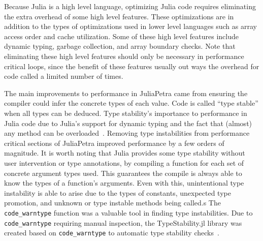 \documentclass[acmsmall]{acmart}
\newcommand{\snippet}[1]{\lstinline{#1}}
\begin{document}
	Because Julia is a high level language, optimizing Julia code requires eliminating the extra overhead of some high level features.
	These optimizations are in addition to the types of optimizations used in lower level languages such as array access order and cache utilization.
	Some of these high level features include dynamic typing, garbage collection, and array boundary checks.
	Note that eliminating these high level features should only be necessary in performance critical loops, since the benefit of these features usually out ways the overhead for code called a limited number of times.
	
	The main improvements to performance in JuliaPetra came from ensuring the compiler could infer the concrete types of each value.
	Code is called ``type stable'' when all types can be deduced.
	Type stability's importance to performance in Julia code due to Julia's support for dynamic typing and the fact that (almost) any method can be overloaded~\cite{Bezanson:2017:FreshApproach}.
	Removing type instabilities from performance critical sections of JuliaPetra improved performance by a few orders of magnitude.
	It is worth noting that Julia provides some type stability without user intervention or type annotations, by compiling a function for each set of concrete argument types used.
	This guarantees the compile is always able to know the types of a function's arguments.
	Even with this, unintentional type instability is able to arise due to the types of constants, unexpected type promotion, and unknown or type instable methods being called.s
	The \snippet{code_warntype} function was a valuable tool in finding type instabilities.
	Due to \snippet{code_warntype} requiring manual inspection, the TypeStability.jl library was created
	based on \snippet{code_warntype} to automatic type stability checks~\cite{Github:TypeStability.jl}.
	
\end{document}
